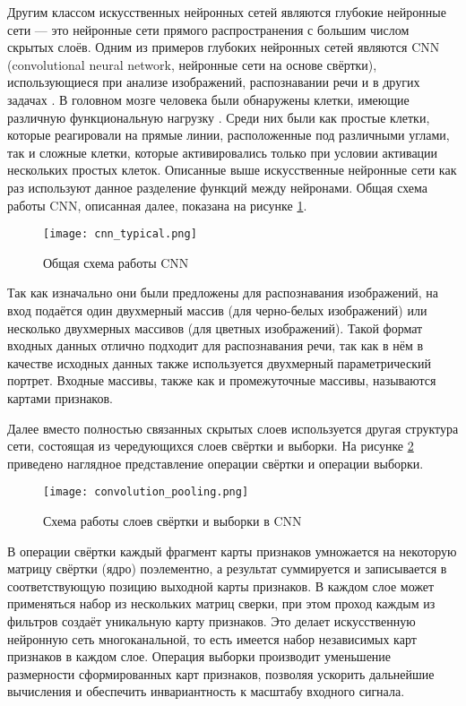 Другим классом искусственных нейронных сетей являются глубокие нейронные сети --- это нейронные сети прямого распространения с большим числом скрытых слоёв.
Одним из примеров глубоких нейронных сетей являются CNN (convolutional neural network, нейронные сети на основе свёртки), использующиеся при анализе изображений, распознавании речи и в других задачах \cite{lecun1995convolutional, abdel2014convolutional}.
В головном мозге человека были обнаружены клетки, имеющие различную функциональную нагрузку \cite{matsugu2003subject}.
Среди них были как простые клетки, которые реагировали на прямые линии, расположенные под различными углами, так и сложные клетки, которые активировались только при условии активации нескольких простых клеток.
Описанные выше искусственные нейронные сети как раз используют данное разделение функций между нейронами.
Общая схема работы CNN, описанная далее, показана на рисунке \ref{fig:cnn_typical}.

\begin{figure}[h]
	\centering
	\texttt{[image: cnn\_typical.png]}
	\caption{Общая схема работы CNN}
	\label{fig:cnn_typical}
\end{figure}

Так как изначально они были предложены для распознавания изображений, на вход подаётся один двухмерный массив (для черно-белых изображений) или несколько двухмерных массивов (для цветных изображений).
Такой формат входных данных отлично подходит для распознавания речи, так как в нём в качестве исходных данных также используется двухмерный параметрический портрет.
Входные массивы, также как и промежуточные массивы, называются картами признаков.

Далее вместо полностью связанных скрытых слоев используется другая структура сети, состоящая из чередующихся слоев свёртки и выборки.
На рисунке \ref{fig:convolution_pooling} приведено наглядное представление операции свёртки и операции выборки.

\begin{figure}[h]
	\centering
	\texttt{[image: convolution\_pooling.png]}
	\caption{Схема работы слоев свёртки и выборки в CNN}
	\label{fig:convolution_pooling}
\end{figure}

В операции свёртки каждый фрагмент карты признаков умножается на некоторую матрицу свёртки (ядро) поэлементно, а результат суммируется и записывается в соответствующую позицию выходной карты признаков.
В каждом слое может применяться набор из нескольких матриц сверки, при этом проход каждым из фильтров создаёт уникальную карту признаков.
Это делает искусственную нейронную сеть многоканальной, то есть имеется набор независимых карт признаков в каждом слое.
Операция выборки производит уменьшение размерности сформированных карт признаков, позволяя ускорить дальнейшие вычисления и обеспечить инвариантность к масштабу входного сигнала.

